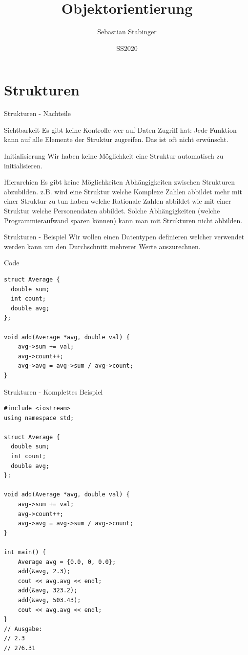 \documentclass[presentation]{beamer}
\author{Sebastian Stabinger}
\date{SS2020}
\title{Objektorientierung}
\begin{document}
\maketitle
\section{Strukturen}
\label{sec:orgbb93fad}
\begin{frame}[label={sec:org4641fa6}]{Strukturen - Nachteile}
\begin{block}{Sichtbarkeit}
Es gibt keine Kontrolle wer auf Daten Zugriff hat: Jede Funktion kann
auf \alert{alle Elemente} der Struktur zugreifen. Das ist oft nicht
erwünscht.
\end{block}
\begin{block}{Initialisierung}
Wir haben keine Möglichkeit eine Struktur \alert{automatisch zu
initialisieren}.
\end{block}
\begin{block}{Hierarchien}
Es gibt keine Möglichkeiten \alert{Abhängigkeiten zwischen Strukturen
abzubilden}. z.B. wird eine Struktur welche Komplexe Zahlen abbildet
mehr mit einer Struktur zu tun haben welche Rationale Zahlen abbildet
wie mit einer Struktur welche Personendaten abbildet. Solche
Abhängigkeiten (welche Programmieraufwand sparen können) kann man mit
Strukturen nicht abbilden.
\end{block}
\end{frame}
\begin{frame}[fragile,label={sec:orgdd53ad0}]{Strukturen - Beispiel}
 Wir wollen einen Datentypen definieren welcher verwendet werden kann
um den Durchschnitt mehrerer Werte auszurechnen.
\begin{exampleblock}{Code}
\begin{verbatim}
struct Average {
  double sum;
  int count;
  double avg;
};

void add(Average *avg, double val) {
    avg->sum += val;
    avg->count++;
    avg->avg = avg->sum / avg->count;
}
\end{verbatim}
\end{exampleblock}
\end{frame}
\begin{frame}[fragile,label={sec:orgb96b4df}]{Strukturen - Komplettes Beispiel}
 \begin{verbatim}
#include <iostream>
using namespace std;

struct Average {
  double sum;
  int count;
  double avg;
};

void add(Average *avg, double val) {
    avg->sum += val;
    avg->count++;
    avg->avg = avg->sum / avg->count;
}

int main() {
    Average avg = {0.0, 0, 0.0};
    add(&avg, 2.3);
    cout << avg.avg << endl;
    add(&avg, 323.2);
    add(&avg, 503.43);
    cout << avg.avg << endl;
}
// Ausgabe:
// 2.3
// 276.31
\end{verbatim}
\end{frame}
\end{document}
